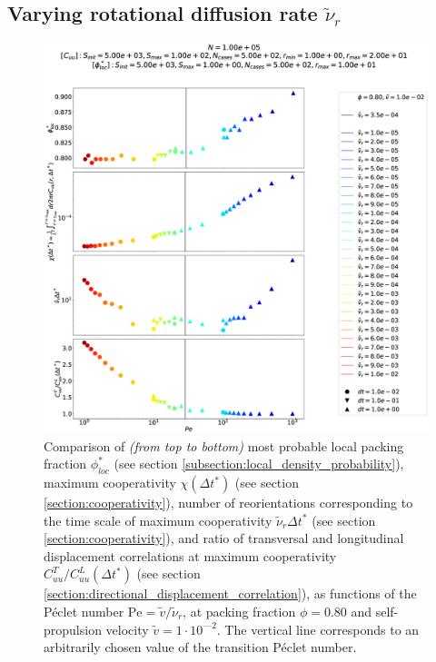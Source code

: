 \documentclass[class=report, float=false, crop=false]{standalone}
\begin{document}
\subsection{Varying rotational diffusion rate $\tilde{\nu}_r$}
\vfill
\begin{figure}[h!]
\centering
\includegraphics[width=\textwidth]{figures/figs/comparison_Dk8000_Vj1000_drdt.eps}
\caption{Comparison of \textit{(from top to bottom)} most probable local packing fraction $\phi_{loc}^*$ (see section \ref{subsection:local_density_probability}), maximum cooperativity $\chi(\Delta t^*)$ (see section \ref{section:cooperativity}), number of reorientations corresponding to the time scale of maximum cooperativity $\tilde{\nu}_r\Delta t^*$ (see section \ref{section:cooperativity}), and ratio of transversal and longitudinal displacement correlations at maximum cooperativity $C_{uu}^T/C_{uu}^L(\Delta t^*)$ (see section \ref{section:directional_displacement_correlation}), as functions of the P\'eclet number $\text{Pe} = \tilde{v}/\tilde{\nu}_r$, at packing fraction $\phi = 0.80$ and self-propulsion velocity $\tilde{v} = 1\cdot10^{—2}$. The vertical line corresponds to an arbitrarily chosen value of the transition P\'eclet number.}
\label{comparison_Dk8000_Vj1000}
\end{figure}
\vfill

\newpage
\end{document}
